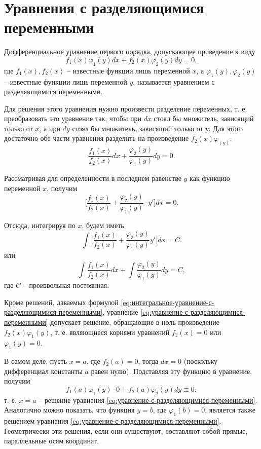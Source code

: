 \documentclass[a5paper, 11pt]{extbook}
\theoremstyle{definition}
\theoremstyle{definition}
\begin{document}
\section{Уравнения с разделяющимися переменными}

Дифференциальное уравнение первого порядка, допускающее приведение к виду
\begin{equation}
    \label{eq:уравнение-с-разделяющимися-переменными}
    f_1(x) \varphi_1(y) dx + f_2(x) \varphi_2(y) dy = 0,
\end{equation}
где \(f_1(x), f_2(x)\) -- известные функции лишь переменной \(x\), а \(\varphi_1(y), \varphi_2(y)\) -- известные функции лишь переменной \(y\), называется уравнением с разделяющимися переменными.

Для решения этого уравнения нужно произвести разделение переменных, т. е. преобразовать это уравнение так, чтобы при \(dx\) стоял бы множитель, зависящий только от \(x\), а при \(dy\) стоял бы множитель, зависящий только от y. Для этого достаточно обе части уравнения разделить на произведение \(f_2(x) \varphi_(y)\):
\[
    \frac{f_1(x)}{f_2(x)} dx + \frac{\varphi_2(y)}{\varphi_1(y)} dy = 0.
\]

Рассматривая для определенности в последнем равенстве \(y\) как функцию переменной \(x\), получим
\[
    \Big[ \frac{f_1(x)}{f_2(x)} + \frac{\varphi_2(y)}{\varphi_1(y)} \cdot y' \Big] dx = 0.
\]

Отсюда, интегрируя по \(x\), будем иметь
\[
    \int \Big[ \frac{f_1(x)}{f_2(x)} + \frac{\varphi_2(y)}{\varphi_1(y)}y' \Big] dx = C.
\]
или
\begin{equation}
    \label{eq:интегральное-уравнение-с-разделяющимися-переменными}
    \int \frac{f_1(x)}{f_2(x)} dx + \int \frac{\varphi_2(y)}{\varphi_1(y)} dy = C,
\end{equation}
где \(C\) -- произвольная постоянная.

Кроме решений, даваемых формулой \eqref{eq:интегральное-уравнение-с-разделяющимися-переменными}, уравнение \eqref{eq:уравнение-с-разделяющимися-переменными} допускает решение, обращающие в ноль произведение \(f_2(x) \varphi_1(y)\), т. е. являющиеся корнями уравнений \(f_2(x) = 0\) или \(\varphi_1(y) = 0\).

В самом деле, пусть \(x = a\), где \(f_2(a) = 0\), тогда \(dx = 0\) (поскольку дифференциал константы \(a\) равен нулю). Подставляя эту функцию в уравнение, получим
\[
    f_1(a) \varphi_1(y) \cdot 0 + f_2(a) \varphi_2(y) dy \equiv 0,
\]
т. е. \(x = a\) -- решение уравнения \eqref{eq:уравнение-с-разделяющимися-переменными}. Аналогично можно показать, что функция \(y = b\), где \(\varphi_1(b) = 0\), является также решением уравнения \eqref{eq:уравнение-с-разделяющимися-переменными}. Геометрически эти решения, если они существуют, составляют собой прямые, параллельные осям координат.
\end{document}
